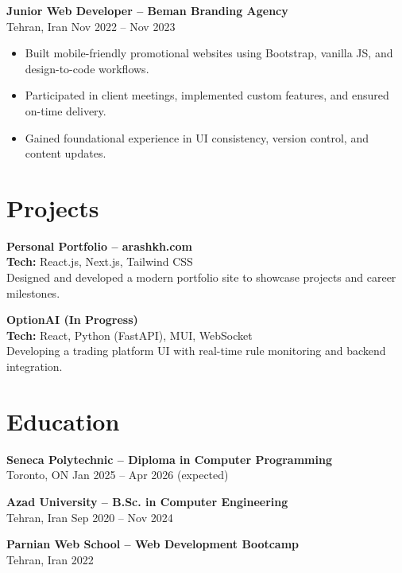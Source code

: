 \documentclass[letterpaper,11pt]{article}
\begin{document}
\textbf{Junior Web Developer – Beman Branding Agency}\\
Tehran, Iran \hfill Nov 2022 -- Nov 2023
\begin{itemize}[leftmargin=*]
  \item Built mobile-friendly promotional websites using Bootstrap, vanilla JS, and design-to-code workflows.
  \item Participated in client meetings, implemented custom features, and ensured on-time delivery.
  \item Gained foundational experience in UI consistency, version control, and content updates.
\end{itemize}

\section*{Projects}
\textbf{Personal Portfolio – arashkh.com}\\
\textbf{Tech:} React.js, Next.js, Tailwind CSS\\
Designed and developed a modern portfolio site to showcase projects and career milestones.

\textbf{OptionAI (In Progress)}\\
\textbf{Tech:} React, Python (FastAPI), MUI, WebSocket\\
Developing a trading platform UI with real-time rule monitoring and backend integration.

\section*{Education}
\textbf{Seneca Polytechnic – Diploma in Computer Programming}\\
Toronto, ON \hfill Jan 2025 -- Apr 2026 (expected)

\textbf{Azad University – B.Sc. in Computer Engineering}\\
Tehran, Iran \hfill Sep 2020 -- Nov 2024

\textbf{Parnian Web School – Web Development Bootcamp}\\
Tehran, Iran \hfill 2022
\end{document}
